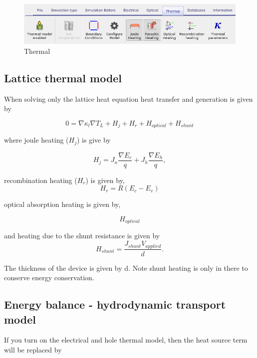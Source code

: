 \begin{figure}[ht!]
\centering
\includegraphics[width=120mm]{./images/thermal_ribbon.png}
\caption{Thermal}
\label{fig:thermal}
\end{figure}

\subsection{Lattice thermal model}
\label{sec:lattice}

When solving only the lattice heat equation heat transfer and generation is given by

\begin{equation}
0 = \nabla   \kappa_{l} \nabla T_{L} +H_j +H_r +H_{optical}+H_{shunt}
\end{equation}

where joule heating ($H_j$) is give by

\begin{equation}
H_j= J_{n} \frac{\nabla E_{c}}{q} + J_{h} \frac{\nabla E_{h}}{q} ,
\end{equation}

recombination heating ($H_r$) is given by, 
\begin{equation}
H_r=R(E_{c}-E_{v})
\end{equation}

optical absorption heating is given by,

\begin{equation}
H_{optical}
\end{equation}

and heating due to the shunt resistance is given by 
\begin{equation}
H_{shunt}=\frac{J_{shunt} V_{applied}}{d}.
\end{equation}

The thickness of the device is given by d. Note shunt heating is only in there to conserve energy conservation.



\subsection{Energy balance - hydrodynamic transport model}
\label{sec:energy}
If you turn on the electrical and hole thermal model, then the heat source term will be replaced by

